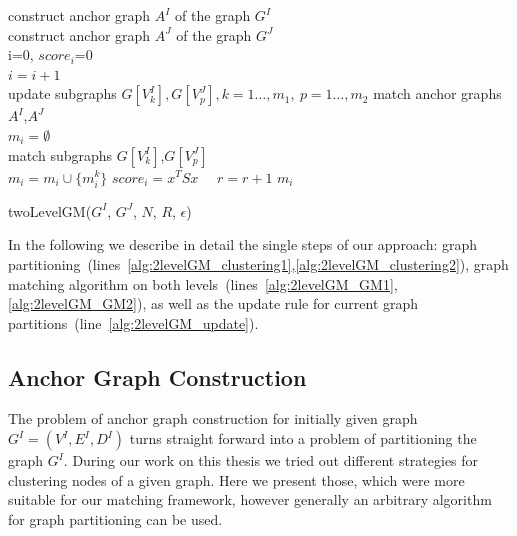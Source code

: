 \begin{algorithm}[h]
	construct anchor graph $A^I$ of the graph $G^I$ \label{alg:2levelGM_clustering1}\\
	construct anchor graph $A^J$ of the graph $G^J$ \label{alg:2levelGM_clustering2}\\
	i=0, $score_i$=0\\
	{ $i=i+1$ \\
	  {update subgraphs $G[V^I_k],G[V^J_p],k=1\dots,m_1,\ p=1\dots,m_2$ \label{alg:2levelGM_update}}
	  match anchor graphs $A^I$,$A^J$ \label{alg:2levelGM_GM1} \\
	  $m_i=\emptyset$\\
	  {match subgraphs $G[V^I_k]$,$G[V^J_p]$ \label{alg:2levelGM_GM2}\\
	   $m_i=m_i\cup\{m^k_i\}$\hspace{55pt}
	  }
	  $score_i=x^TSx$\ \ 
	  {$r=r+1$}
	}
	\Return $m_i$
	\caption{twoLevelGM($G^I$, $G^J$, $N$, $R$, $\epsilon$)} \label{alg:2levelGM}
\end{algorithm}

In the following we describe in detail the single steps of our approach: %
graph partitioning~(lines~\ref{alg:2levelGM_clustering1},\ref{alg:2levelGM_clustering2}), graph matching algorithm on both levels~(lines~\ref{alg:2levelGM_GM1},\ref{alg:2levelGM_GM2}), as well as the update rule for current graph partitions~(line~\ref{alg:2levelGM_update}).
\subsection{Anchor Graph Construction}
The problem of anchor graph construction for initially given graph $G^I=(V^I,E^I,D^I)$ turns straight forward into a problem of partitioning the graph $G^I$. During our work on this thesis we tried out different strategies for clustering nodes of a given graph. Here we present those, which were more suitable for our matching framework, however generally an arbitrary algorithm for graph partitioning can be used.

